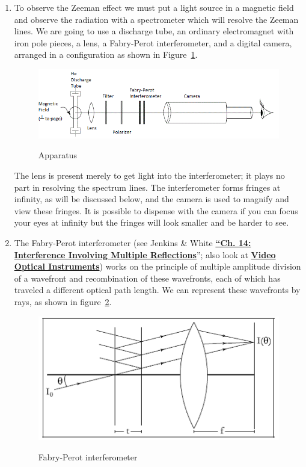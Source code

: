 \documentclass{../lab}
\begin{document}
\begin{enumerate}
    \item To observe the Zeeman effect we must put a light source in a magnetic field and observe the radiation with a spectrometer which will resolve the Zeeman lines. We are going to use a discharge tube, an ordinary electromagnet with iron pole pieces, a lens, a Fabry-Perot interferometer, and a digital camera, arranged in a configuration as shown in Figure~\ref{fig:ATMFig2}. 
    \begin{figure}[h]
        \centering
        \href{http://experimentationlab.berkeley.edu/sites/default/files/images/ATMFig2.gif}{\includegraphics[width=0.5\linewidth]{images/ATMFig2.png}}
        \caption{Apparatus}
        \label{fig:ATMFig2}
    \end{figure}

	The lens is present merely to get light into the interferometer; it plays no part in resolving the spectrum lines. The interferometer forms fringes at infinity, as will be discussed below, and the camera is used to magnify and view these fringes. It is possible to dispense with the camera if you can focus your eyes at infinity but the fringes will look smaller and be harder to see.

    \item The Fabry-Perot interferometer (see Jenkins \& White \href{http://physics111.lib.berkeley.edu/Physics111/Reprints/ATM/04-Interference.pdf}{\textbf{``Ch. 14: Interference Involving Multiple Reflections}}''; also look at \href{http://youtu.be/zUGBt5vc5FA}{\textbf{Video Optical Instruments}}) works on the principle of multiple amplitude division of a wavefront and recombination of these wavefronts, each of which has traveled a different optical path length. We can represent these wavefronts by rays, as shown in figure~\ref{fig:Atm1image005}.

    \begin{figure}[h]
        \centering
        \href{http://experimentationlab.berkeley.edu/sites/default/files/images/Atm1image005.gif}{\includegraphics[width=0.5\linewidth]{images/Atm1image005.png}}
        \caption{Fabry-Perot interferometer}
        \label{fig:Atm1image005}
    \end{figure}


\end{enumerate}
\end{document}
